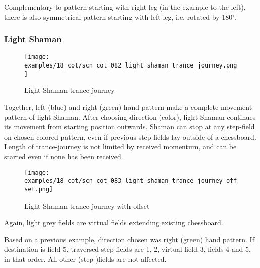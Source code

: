 Complementary to pattern starting with right leg (in the example to the
left), there is also symmetrical pattern starting with left leg, i.e.
rotated by 180$^{\circ}$. %

\clearpage %

\subsubsection*{Light Shaman}
\label{sec:Conquest of Tlalocan/Trance-journey/Movement/Light Shaman}

\vspace*{-1.4\baselineskip}
\noindent
\begin{figure}[!h]
\texttt{[image: examples/18\_cot/scn\_cot\_082\_light\_shaman\_trance\_journey.png]}
\vspace*{-1.3\baselineskip}
\caption{Light Shaman trance-journey}
\label{fig:scn_cot_082_light_shaman_trance_journey}
\end{figure}

\vspace*{-0.5\baselineskip}
Together, left (blue) and right (green) hand pattern make a complete movement
pattern of light Shaman. After choosing direction (color), light Shaman
continues its movement from starting position outwards. Shaman can stop at
any step-field on chosen colored pattern, even if previous step-fields lay
outside of a chessboard. Length of trance-journey is not limited by received
momentum, and can be started even if none has been received.

\clearpage %

\noindent
\begin{figure}[!h]
\texttt{[image: examples/18\_cot/scn\_cot\_083\_light\_shaman\_trance\_journey\_offset.png]}
\caption{Light Shaman trance-journey with offset}
\label{fig:scn_cot_083_light_shaman_trance_journey_offset}
\end{figure}

\hyperref[fig:scn_hd_06_centaur_off_board]{Again},
light grey fields are virtual fields extending existing chessboard.

Based on a previous example, direction chosen was right (green) hand pattern.
If destination is field 5, traversed step-fields are 1, 2, virtual field 3,
fields 4 and 5, in that order. All other (step-)fields are not affected.

